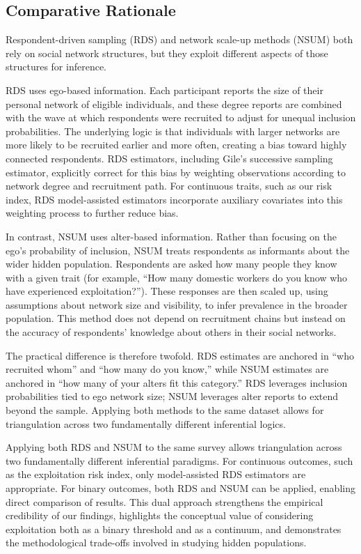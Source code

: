 \documentclass[
  12pt,
  letterpaper,
  DIV=11,
  numbers=noendperiod]{scrartcl}
\theoremstyle{plain}
\theoremstyle{definition}
\begin{document}
\subsection{Comparative Rationale}\label{comparative-rationale}

Respondent-driven sampling (RDS) and network scale-up methods (NSUM)
both rely on social network structures, but they exploit different
aspects of those structures for inference.

RDS uses ego-based information. Each participant reports the size of
their personal network of eligible individuals, and these degree reports
are combined with the wave at which respondents were recruited to adjust
for unequal inclusion probabilities. The underlying logic is that
individuals with larger networks are more likely to be recruited earlier
and more often, creating a bias toward highly connected respondents. RDS
estimators, including Gile's successive sampling estimator, explicitly
correct for this bias by weighting observations according to network
degree and recruitment path. For continuous traits, such as our risk
index, RDS model-assisted estimators incorporate auxiliary covariates
into this weighting process to further reduce bias.

In contrast, NSUM uses alter-based information. Rather than focusing on
the ego's probability of inclusion, NSUM treats respondents as
informants about the wider hidden population. Respondents are asked how
many people they know with a given trait (for example, ``How many
domestic workers do you know who have experienced exploitation?'').
These responses are then scaled up, using assumptions about network size
and visibility, to infer prevalence in the broader population. This
method does not depend on recruitment chains but instead on the accuracy
of respondents' knowledge about others in their social networks.

The practical difference is therefore twofold. RDS estimates are
anchored in ``who recruited whom'' and ``how many do you know,'' while
NSUM estimates are anchored in ``how many of your alters fit this
category.'' RDS leverages inclusion probabilities tied to ego network
size; NSUM leverages alter reports to extend beyond the sample. Applying
both methods to the same dataset allows for triangulation across two
fundamentally different inferential logics.

Applying both RDS and NSUM to the same survey allows triangulation
across two fundamentally different inferential paradigms. For continuous
outcomes, such as the exploitation risk index, only model-assisted RDS
estimators are appropriate. For binary outcomes, both RDS and NSUM can
be applied, enabling direct comparison of results. This dual approach
strengthens the empirical credibility of our findings, highlights the
conceptual value of considering exploitation both as a binary threshold
and as a continuum, and demonstrates the methodological trade-offs
involved in studying hidden populations.
\end{document}
